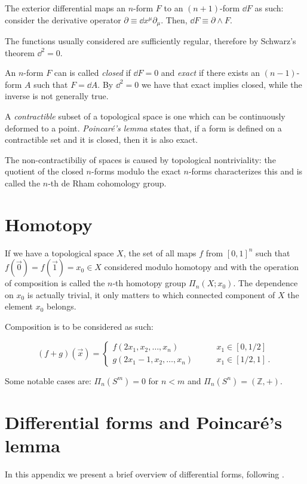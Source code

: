\documentclass[main.tex]{subfiles}
\begin{document}
The exterior differential maps an \(n\)-form \(F\) to an \((n+1)\)-form \(\dd{F}\) as such:
consider the derivative operator \(\partial \equiv \dd{x^{\mu}} \partial _\mu\).
Then, \(\dd{F} \equiv \partial \wedge F\).

The functions usually considered are sufficiently regular, therefore by Schwarz's theorem \(\dd^2 = 0\).

An \(n\)-form \(F\) can is called \emph{closed} if \(\dd{F}= 0 \) and \emph{exact} if there exists an \((n-1)\)-form \(A\) such that \(F = \dd{A}\).
By \(\dd^2=0\) we have that exact implies closed, while the inverse is not generally true.

A \emph{contractible} subset of a topological space is one which can be continuously deformed to a point.
\emph{Poincaré's lemma} states that, if a form is defined on a contractible set and it is closed, then it is also exact.

The non-contractibiliy of spaces is caused by topological nontriviality: the quotient of the closed \(n\)-forms modulo the exact \(n\)-forms characterizes this and is called the \(n\)-th de Rham cohomology group. 

\section{Homotopy} \label{sec:homotopy}

If we have a topological space \(X\), the set of all maps \(f\) from \([0,1]^n\) such that  \(f(\vec{0}) = f(\vec{1} )=x_0 \in X\) considered modulo homotopy and with the operation of composition is called the \(n\)-th homotopy group \(\Pi_n (X; x_0)\). The dependence on \(x_0\) is actually trivial, it only matters to which connected component of \(X\) the element \(x_0\) belongs.

Composition is to be considered as such:

\begin{equation}
  (f+g) (\vec{x} ) = \begin{cases}
  f(2x_1, x_2, \dots, x_n) \qquad & x_1 \in [0, 1/2 ] \\
  g(2x_1-1, x_2, \dots, x_n) \qquad & x_1 \in [1/2, 1] \,.
  \end{cases}
\end{equation}

Some notable cases are: \(\Pi_n (S^m) = 0 \) for \(n<m\) and \(\Pi_n (S^n) = (\mathbb Z, +)\).

\section{Differential forms and Poincaré's lemma} \label{sec:differential-forms}
In this appendix we present a brief overview of differential forms, following \cite{Lechner}.
\end{document}
